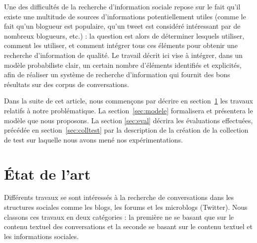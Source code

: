 \documentclass{article-hermes}
\begin{document}
Une des difficultés de la recherche d'information sociale repose sur le fait qu'il existe une multitude de sources d'informations potentiellement utiles (comme le fait qu'un blogueur est populaire, qu'un tweet est considéré intéressant par de nombreux blogueurs, etc.) : la question est alors de déterminer lesquels utiliser, comment les utiliser, et comment intégrer tous ces éléments pour obtenir une recherche d'information de qualité. Le travail décrit ici vise à intégrer, dans un modèle probabiliste clair, un certain nombre d'éléments identifiés et explicités, afin de réaliser un système de recherche d'information qui fournit des bons résultats sur des corpus de conversations. 

Dans la suite de cet article, nous commençons par décrire en section~\ref{sec:eda} les travaux relatifs à notre problématique. La section~\ref{sec:modele} formalisera et présentera le modèle que nous proposons. La section \ref{sec:eval} décrira les évaluations effectuées, précédée en section~\ref{sec:colltest} par la description de la création de la collection de test sur laquelle nous avons mené nos expérimentations.

\section{État de l'art}
\label{sec:eda}

%
\par Différents travaux se sont intéressés à la recherche de conversations dans les structures sociales comme les blogs, les forums et les microblogs (Twitter). Nous classons ces travaux en deux catégories : la première ne se basant que sur le contenu textuel des conversations et la seconde se basant sur le contenu textuel et les informations sociales. 
\end{document}
